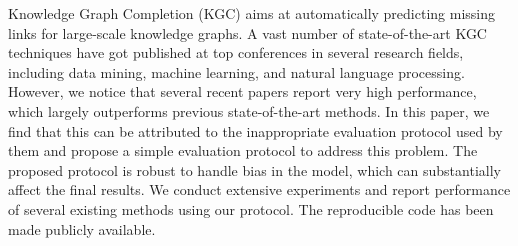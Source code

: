 Knowledge Graph Completion (KGC) aims at automatically predicting missing links for large-scale knowledge graphs. A vast number of state-of-the-art KGC techniques have got published at top conferences in several research fields, including data mining, machine learning, and natural language processing. However, we notice that several recent papers report very high performance, which largely outperforms previous state-of-the-art methods. In this paper, we find that this can be attributed to the inappropriate evaluation protocol used by them and propose a simple evaluation protocol to address this problem. The proposed protocol is robust to handle bias in the model, which can substantially affect the final results. We conduct extensive experiments and report performance of several existing methods using our protocol. The reproducible code has been made publicly available.
